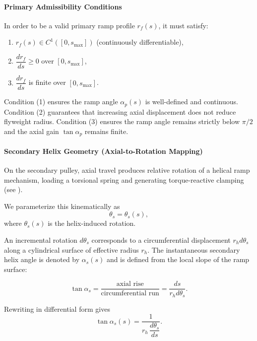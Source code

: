 \documentclass[11pt]{article}
\numberwithin{equation}{section}
\begin{document}
\paragraph{Primary Admissibility Conditions}

In order to be a valid primary ramp profile $r_f(s)$, it must satisfy:

\begin{enumerate}
    \item $r_f(s) \in C^1([0,s_{\max}])$ (continuously differentiable),
    \item $\dfrac{dr_f}{ds} \ge 0$ over $[0, s_{\max}]$,
    \item $\dfrac{dr_f}{ds}$ is finite over $[0, s_{\max}]$.
\end{enumerate}

Condition (1) ensures the ramp angle $\alpha_p(s)$ is well-defined and
continuous. Condition (2) guarantees that increasing axial displacement
does not reduce flyweight radius. Condition (3) ensures the ramp angle
remains strictly below $\pi/2$ and the axial gain $\tan\alpha_p$ remains finite.

\paragraph{Secondary Helix Geometry (Axial-to-Rotation Mapping)}

On the secondary pulley, axial travel produces relative rotation
of a helical ramp mechanism, loading a torsional spring and generating
torque-reactive clamping (see ).

We parameterize this kinematically as
\begin{equation}
\theta_s = \theta_s(s),
\label{eq:secondary_theta_profile}
\end{equation}
where $\theta_s(s)$ is the helix-induced rotation.

An incremental rotation $d\theta_s$ corresponds to a circumferential
displacement $r_h d\theta_s$ along a cylindrical surface of effective
radius $r_h$. The instantaneous secondary helix angle is denoted by
$\alpha_s(s)$ and is defined from the local slope of the ramp surface:

\[
\tan\alpha_s
=
\frac{\text{axial rise}}{\text{circumferential run}}
=
\frac{ds}{r_h d\theta_s}.
\]

Rewriting in differential form gives
\begin{equation}
\tan\alpha_s(s)
=
\frac{1}{r_h \, \dfrac{d\theta_s}{ds}}.
\label{eq:alpha_secondary_inverse_slope}
\end{equation}
\end{document}
